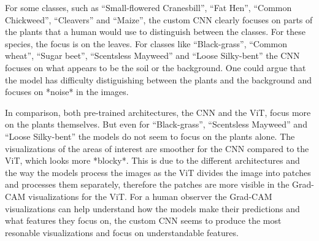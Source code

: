 For some classes, such as ``Small-flowered Cranesbill'', ``Fat Hen'', ``Common Chickweed'', ``Cleavers'' and ``Maize'', the custom CNN clearly focuses on parts of the plants that a human would use to distinguish between the classes. For these species, the focus is on the leaves. For classes like ``Black-grass'', ``Common wheat'', ``Sugar beet'', ``Scentsless Mayweed'' and ``Loose Silky-bent'' the CNN focuses on what appears to be the soil or the background. One could argue that the model has difficulty distiguishing between the plants and the background and focuses on *noise* in the images.

In comparison, both pre-trained architectures, the CNN and the ViT, focus more on the plants themselves. But even for ``Black-grass'', ``Scentsless Mayweed'' and ``Loose Silky-bent'' the models do not seem to focus on the plants alone. The visualizations of the areas of interest are smoother for the CNN compared to the ViT, which looks more *blocky*. This is due to the different architectures and the way the models process the images as the ViT divides the image into patches and processes them separately, therefore the patches are more visible in the Grad-CAM visualizations for the ViT. For a human observer the Grad-CAM visualizations can help understand how the models make their predictions and what features they focus on, the custom CNN seems to produce the most resonable visualizations and focus on understandable features.